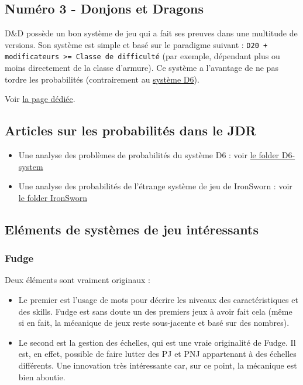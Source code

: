 \documentclass[a4paper, 11pt, twoside]{article}
\begin{document}
\subsection{Numéro 3 - Donjons et Dragons}
\label{sec:orge46dadc}

D\&D possède un bon système de jeu qui a fait ses preuves dans une multitude de versions. Son système est simple et basé sur le paradigme suivant : \texttt{D20 + modificateurs >= Classe de difficulté} (par exemple, dépendant plus ou moins directement de la classe d'armure). Ce système a l'avantage de ne pas tordre les probabilités (contrairement au \href{https://github.com/orey/jdr/tree/master/D6-System}{système D6}).

Voir \href{https://github.com/orey/jdr/tree/master/DandD}{la page dédiée}.

\subsection{Articles sur les probabilités dans le JDR}
\label{sec:org41fab51}

\begin{itemize}
\item Une analyse des problèmes de probabilités du système D6 : voir \href{https://github.com/orey/jdr/tree/master/D6-System}{le folder D6-system}
\item Une analyse des probabilités de l'étrange système de jeu de IronSworn : voir \href{https://github.com/orey/jdr/tree/master/IronSworn}{le folder IronSworn}
\end{itemize}

\subsection{Eléments de systèmes de jeu intéressants}
\label{sec:org9d3b757}
\subsubsection{Fudge}
\label{sec:orge30ff21}

Deux éléments sont vraiment originaux :
\begin{itemize}
\item Le premier est l'usage de mots pour décrire les niveaux des caractéristiques et des skills. Fudge est sans doute un des premiers jeux à avoir fait cela (même si en fait, la mécanique de jeux reste sous-jacente et basé sur des nombres).
\item Le second est la gestion des échelles, qui est une vraie originalité de Fudge. Il est, en effet, possible de faire lutter des PJ et PNJ appartenant à des échelles différents. Une innovation très intéressante car, sur ce point, la mécanique est bien aboutie.
\end{itemize}
\end{document}
